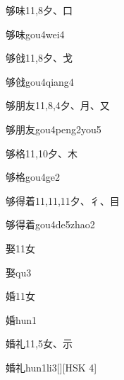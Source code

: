\begin{Entry}{够味}{11,8}{⼣、⼝}
  \begin{Phonetics}{够味}{gou4wei4}
  \end{Phonetics}
\end{Entry}

\begin{Entry}{够戗}{11,8}{⼣、⼽}
  \begin{Phonetics}{够戗}{gou4qiang4}
  \end{Phonetics}
\end{Entry}

\begin{Entry}{够朋友}{11,8,4}{⼣、⽉、⼜}
  \begin{Phonetics}{够朋友}{gou4peng2you5}
  \end{Phonetics}
\end{Entry}

\begin{Entry}{够格}{11,10}{⼣、⽊}
  \begin{Phonetics}{够格}{gou4ge2}
  \end{Phonetics}
\end{Entry}

\begin{Entry}{够得着}{11,11,11}{⼣、⼻、⽬}
  \begin{Phonetics}{够得着}{gou4de5zhao2}
  \end{Phonetics}
\end{Entry}

\begin{Entry}{娶}{11}{⼥}
  \begin{Phonetics}{娶}{qu3}
  \end{Phonetics}
\end{Entry}

\begin{Entry}{婚}{11}{⼥}
  \begin{Phonetics}{婚}{hun1}
  \end{Phonetics}
\end{Entry}

\begin{Entry}{婚礼}{11,5}{⼥、⽰}
  \begin{Phonetics}{婚礼}{hun1li3}[][HSK 4]
  \end{Phonetics}
\end{Entry}

